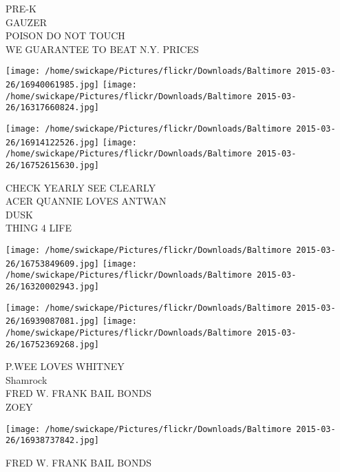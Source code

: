 \documentclass[10pt,letterpaper]{article}
\begin{document}
PRE{-}K\\
GAUZER\\
POISON DO NOT TOUCH\\
WE GUARANTEE TO BEAT N.Y. PRICES
\pagebreak

\texttt{[image: /home/swickape/Pictures/flickr/Downloads/Baltimore 2015-03-26/16940061985.jpg]}
\texttt{[image: /home/swickape/Pictures/flickr/Downloads/Baltimore 2015-03-26/16317660824.jpg]}

\texttt{[image: /home/swickape/Pictures/flickr/Downloads/Baltimore 2015-03-26/16914122526.jpg]}
\texttt{[image: /home/swickape/Pictures/flickr/Downloads/Baltimore 2015-03-26/16752615630.jpg]}

CHECK YEARLY SEE CLEARLY\\
ACER QUANNIE LOVES ANTWAN\\
DUSK\\
THING 4 LIFE
\pagebreak

\texttt{[image: /home/swickape/Pictures/flickr/Downloads/Baltimore 2015-03-26/16753849609.jpg]}
\texttt{[image: /home/swickape/Pictures/flickr/Downloads/Baltimore 2015-03-26/16320002943.jpg]}

\texttt{[image: /home/swickape/Pictures/flickr/Downloads/Baltimore 2015-03-26/16939087081.jpg]}
\texttt{[image: /home/swickape/Pictures/flickr/Downloads/Baltimore 2015-03-26/16752369268.jpg]}

P.WEE LOVES WHITNEY\\
Shamrock\\
FRED W. FRANK BAIL BONDS\\
ZOEY
\pagebreak

\texttt{[image: /home/swickape/Pictures/flickr/Downloads/Baltimore 2015-03-26/16938737842.jpg]}

FRED W. FRANK BAIL BONDS
\pagebreak
\end{document}
